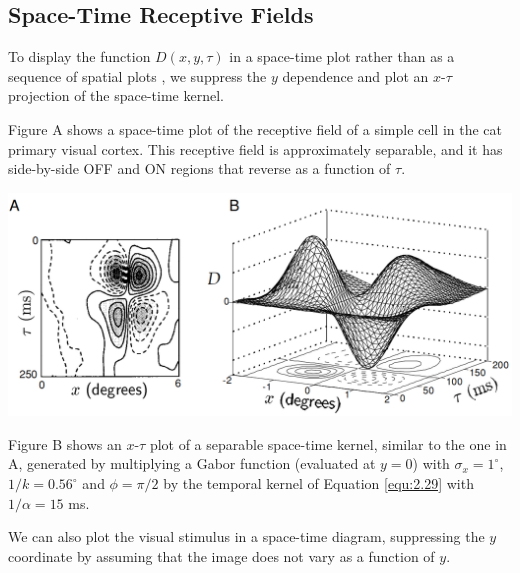 \subsection{Space-Time Receptive Fields}
\label{sec:Space-TimeReceptiveFields}

\begin{rem}
  To display the function $D(x, y,\tau)$ in a space-time plot rather than as a sequence of spatial plots , we suppress the $y$ dependence and plot an $x$-$\tau$ projection of the space-time kernel.
\end{rem}

\begin{exm}
  \label{exm:separableSpaceTimePlotExm}
  Figure A shows a space-time plot of the receptive field of a simple cell in the cat primary visual cortex. This receptive field is approximately separable, and it has side-by-side OFF and ON regions that reverse as a function of $\tau$.
  \begin{center}
    \includegraphics[scale=0.2]{./png/spaceTimePlotExm}
  \end{center}
  Figure B shows an $x$-$\tau$ plot of a separable space-time kernel, similar to the one in A, generated by multiplying a Gabor function (evaluated at $y = 0$) with $\sigma_x = 1^{\circ}$, $1/k = 0.56^{\circ}$ and $\phi = \pi/2$ by the temporal kernel of Equation \ref{equ:2.29} with $1/\alpha = 15$ ms.
\end{exm}

\begin{rem}
  We can also plot the visual stimulus in a space-time diagram, suppressing the $y$ coordinate by assuming that the image does not vary as a function of $y$.
\end{rem}

